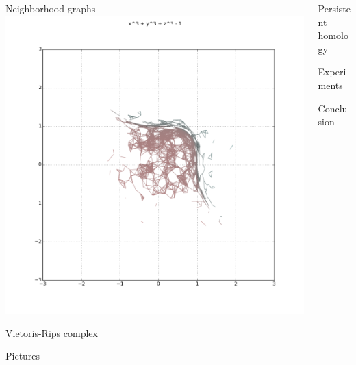\documentclass{beamer}
\begin{document}
\begin{frame}{}
\begin{columns}[t]
\begin{column}{0.32\linewidth}
\begin{block}{Neighborhood graphs}
\centering
\includegraphics[width=1\columnwidth]{plot2d_ng_7}

\end{block}

\begin{block}{Vietoris-Rips complex}

\end{block}

\begin{block}{Pictures}
\begin{figure}[htb]

\end{figure}
\end{block}

\end{column}%

\begin{column}{0.32\linewidth}

\begin{block}{Persistent homology}

\end{block}

\begin{block}{Experiments}

\end{block}

\begin{block}{Conclusion}

\end{block}

\end{column}%

\end{columns}
\end{frame}
\end{document}
